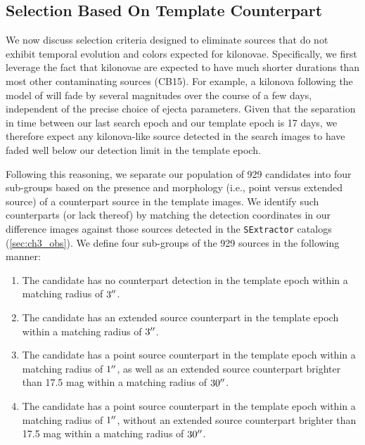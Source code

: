 \subsection{Selection Based On Template Counterpart}
\label{sec:ch3_source_cuts}

We now discuss selection criteria designed to eliminate sources that do not exhibit temporal evolution and colors expected for kilonovae. Specifically, we first leverage the fact that kilonovae are expected to have much shorter durations than most other contaminating sources (CB15). For example, a kilonova following the model of \citealt{BarnesKasen13} will fade by several magnitudes over the course of a few days, independent of the precise choice of ejecta parameters. Given that the separation in time between our last search epoch and our template epoch is 17 days, we therefore expect any kilonova-like source detected in the search images to have faded well below our detection limit in the template epoch.

Following this reasoning, we separate our population of 929 candidates into four sub-groups based on the presence and morphology (i.e., point versus extended source) of a counterpart source in the template images. We identify such counterparts (or lack thereof) by matching the detection coordinates in our difference images against those sources detected in the {\tt SExtractor} catalogs (\cref{sec:ch3_obs}). We define four sub-groups of the 929 sources in the following manner:

\begin{enumerate}
\item The candidate has no counterpart detection in the template epoch within a matching radius of $3\hbox{$^{\prime\prime}$}$.

\item The candidate has an extended source counterpart in the template epoch within a matching radius of $3 \hbox{$^{\prime\prime}$}$.

\item The candidate has a point source counterpart in the template epoch within a matching radius of $1\hbox{$^{\prime\prime}$}$, as well as an extended source counterpart brighter than 17.5 mag within a matching radius of $30\hbox{$^{\prime\prime}$}$.

\item The candidate has a point source counterpart in the template epoch within a matching radius of $1\hbox{$^{\prime\prime}$}$, without an extended source counterpart brighter than 17.5 mag  within a matching radius of $30\hbox{$^{\prime\prime}$}$.
\end{enumerate}

